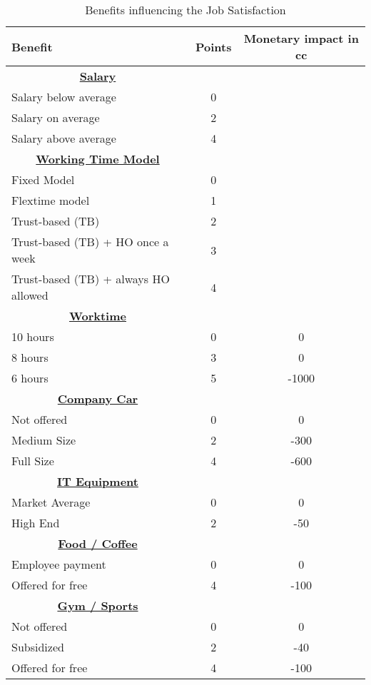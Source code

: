 \begin{table}
    \centering
\begin{tabular}{l|c|c}
    \hline
     \textbf{Benefit} & \textbf{Points} & \textbf{Monetary impact in cc} \\
     \hline \hline
     \multicolumn{1}{c|}{\underline{\textbf{Salary}}} & & \\
     Salary below average & 0 &  \\
     Salary on average & 2 &  \\
     Salary above average & 4 &   \\
     \hline
     \multicolumn{1}{c|}{\underline{\textbf{Working Time Model}}} & & \\
     Fixed Model & 0 &   \\
     Flextime model & 1 &   \\
     Trust-based (TB) & 2 &   \\
     Trust-based (TB) + HO once a week & 3 &   \\
     Trust-based (TB) + always HO allowed & 4 &   \\
     \hline
     \multicolumn{1}{c|}{\underline{\textbf{Worktime}}} & & \\
     10 hours & 0 & 0  \\
     8 hours & 3 & 0  \\
     6 hours & 5 & -1000  \\
     \hline
     \multicolumn{1}{c|}{\underline{\textbf{Company Car}}} & & \\
     Not offered & 0 & 0  \\
     Medium Size & 2 & -300  \\
     Full Size & 4 & -600  \\
     \hline
     \multicolumn{1}{c|}{\underline{\textbf{IT Equipment}}} & & \\
     Market Average & 0 & 0  \\
     High End & 2 & -50  \\
     \hline
     \multicolumn{1}{c|}{\underline{\textbf{Food / Coffee}}} & & \\
     Employee payment & 0 & 0  \\
     Offered for free & 4 & -100  \\
     \hline
     \multicolumn{1}{c|}{\underline{\textbf{Gym / Sports}}} & & \\
     Not offered & 0 & 0  \\
     Subsidized & 2 & -40 \\
     Offered for free & 4 & -100  \\
     \hline

\end{tabular}
\caption{Benefits influencing the Job Satisfaction}
    \label{tab:benefitsJSS}
\end{table}


